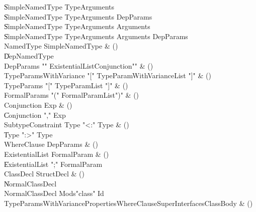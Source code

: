 \begin{bbgrammar}

    \| SimpleNamedType TypeArguments\\
    \| SimpleNamedType TypeArguments DepParams\\
    \| SimpleNamedType TypeArguments Arguments\\
    \| SimpleNamedType TypeArguments Arguments DepParams\\
 NamedType  \label{prod:NamedType}  \: SimpleNamedType & ()\\
    \| DepNamedType\\
 DepParams  \label{prod:DepParams}  \: \xcd"{" ExistentialList\opt Conjunction\opt \xcd"}" & ()\\
 TypeParamsWithVariance  \label{prod:TypeParamsWithVariance}  \: \xcd"[" TypeParamWithVarianceList \xcd"]" & ()\\
 TypeParams  \label{prod:TypeParams}  \: \xcd"[" TypeParamList \xcd"]" & ()\\
 FormalParams  \label{prod:FormalParams}  \: \xcd"(" FormalParamList\opt \xcd")" & ()\\
 Conjunction  \label{prod:Conjunction}  \: Exp & ()\\
    \| Conjunction \xcd"," Exp\\
 SubtypeConstraint  \label{prod:SubtypeConstraint}  \: Type  \xcd"<:" Type  & ()\\
    \| Type  \xcd":>" Type \\
 WhereClause  \label{prod:WhereClause}  \: DepParams & ()\\
 ExistentialList  \label{prod:ExistentialList}  \: FormalParam & ()\\
    \| ExistentialList \xcd";" FormalParam\\
 ClassDecl  \label{prod:ClassDecl}  \: StructDecl & ()\\
    \| NormalClassDecl\\
 NormalClassDecl  \label{prod:NormalClassDecl}  \: Mods\opt \xcd"class" Id TypeParamsWithVariance\opt Properties\opt WhereClause\opt Super\opt Interfaces\opt ClassBody & ()\\

\end{bbgrammar}
